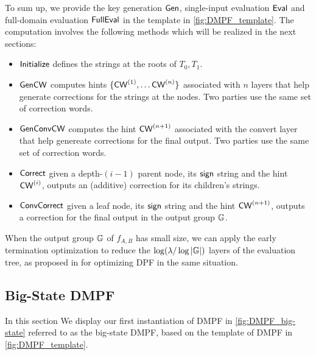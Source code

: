 To sum up, we provide the key generation ${\sf Gen}$, single-input evaluation ${\sf Eval}$ and full-domain evaluation ${\sf FullEval}$ in the template in \cref{fig:DMPF_template}. The computation involves the following methods which will be realized in the next sections: 
\begin{itemize}
  \item $\sf Initialize$ defines the strings at the roots of $T_0,T_1$.
  \item $\sf GenCW$ computes hints $\{{\sf CW}^{(1)},\dots {\sf CW}^{(n)}\}$ associated with $n$ layers that help generate corrections for the strings at the nodes. Two parties use the same set of correction words. 
  \item $\sf GenConvCW$ computes the hint ${\sf CW}^{(n+1)}$ associated with the convert layer that help genereate corrections for the final output. Two parties use the same set of correction words. 
  \item $\sf Correct$ given a depth-$(i-1)$ parent node, its ${\sf sign}$ string and the hint ${\sf CW}^{(i)}$, outputs an (additive) correction for its children's strings. 
  \item $\sf ConvCorrect$ given a leaf node, its ${\sf sign}$ string and the hint ${\sf CW}^{(n+1)}$, outputs a correction for the final output in the output group $\mathbb{G}$. 
\end{itemize}
\begin{remark}
When the output group $\mathbb{G}$ of $f_{A,B}$ has small size, we can apply the early termination optimization to reduce the $\log(\lambda/\log|\mathbb{G}|)$ layers of the evaluation tree, as proposed in \cite{BoyGilIsh16} for optimizing DPF in the same situation. %
\end{remark}

\subsection{Big-State DMPF}\label{sec:big_state_DMPF}
In this section We display our first instantiation of DMPF in \cref{fig:DMPF_big-state} referred to as the big-state DMPF, based on the template of DMPF in \cref{fig:DMPF_template}. 

